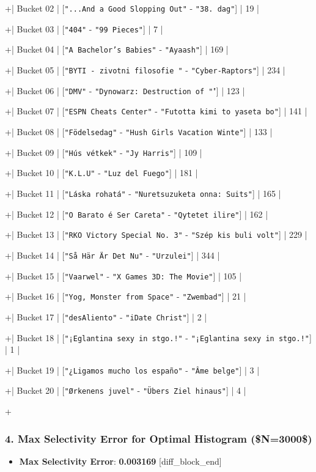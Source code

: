 \documentclass[11pt,a4paper]{article}
\begin{document}
{+| Bucket 02 | [\texttt{"...And a Good Slopping Out"} - \texttt{"38. dag"}] | 19 |

+| Bucket 03 | [\texttt{"404"} - \texttt{"99 Pieces"}] | 7 |

+| Bucket 04 | [\texttt{"A Bachelor's Babies"} - \texttt{"Ayaash"}] | 169 |

+| Bucket 05 | [\texttt{"BYTI - zivotni filosofie "} - \texttt{"Cyber-Raptors"}] | 234 |

+| Bucket 06 | [\texttt{"DMV"} - \texttt{"Dynowarz: Destruction of "}"] | 123 |

+| Bucket 07 | [\texttt{"ESPN Cheats Center"} - \texttt{"Futotta kimi to yaseta bo"}] | 141 |

+| Bucket 08 | [\texttt{"Födelsedag"} - \texttt{"Hush Girls Vacation Winte"}] | 133 |

+| Bucket 09 | [\texttt{"Hús vétkek"} - \texttt{"Jy Harris"}] | 109 |

+| Bucket 10 | [\texttt{"K.L.U"} - \texttt{"Luz del Fuego"}] | 181 |

+| Bucket 11 | [\texttt{"Láska rohatá"} - \texttt{"Nuretsuzuketa onna: Suits"}] | 165 |

+| Bucket 12 | [\texttt{"O Barato é Ser Careta"} - \texttt{"Qytetet ilire"}] | 162 |

+| Bucket 13 | [\texttt{"RKO Victory Special No. 3"} - \texttt{"Szép kis buli volt"}] | 229 |

+| Bucket 14 | [\texttt{"Så Här Är Det Nu"} - \texttt{"Urzulei"}] | 344 |

+| Bucket 15 | [\texttt{"Vaarwel"} - \texttt{"X Games 3D: The Movie"}] | 105 |

+| Bucket 16 | [\texttt{"Yog, Monster from Space"} - \texttt{"Zwembad"}] | 21 |

+| Bucket 17 | [\texttt{"desAliento"} - \texttt{"iDate Christ"}] | 2 |

+| Bucket 18 | [\texttt{"¡Eglantina sexy in stgo.!"} - \texttt{"¡Eglantina sexy in stgo.!"}] | 1 |

+| Bucket 19 | [\texttt{"¿Ligamos mucho los españo"} - \texttt{"Âme belge"}] | 3 |

+| Bucket 20 | [\texttt{"Ørkenens juvel"} - \texttt{"Übers Ziel hinaus"}] | 4 |

+


\subsubsection{4. Max Selectivity Error for Optimal Histogram (\$N=3000\$)}
\begin{itemize}
\item \textbf{Max Selectivity Error}: \textbf{0.003169}
[diff\_block\_end]


\end{itemize}}
\end{document}
